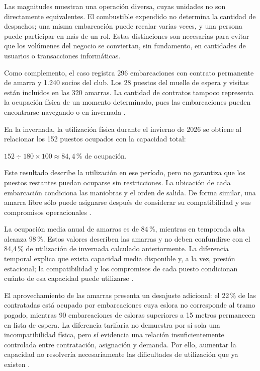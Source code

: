 Las magnitudes muestran una operación diversa, cuyas unidades no son directamente equivalentes. El combustible expendido no determina la cantidad de despachos; una misma embarcación puede recalar varias veces, y una persona puede participar en más de un rol. Estas distinciones son necesarias para evitar que los volúmenes del negocio se conviertan, sin fundamento, en cantidades de usuarios o transacciones informáticas.

Como complemento, el caso registra 296 embarcaciones con contrato permanente de amarra y 1.240 socios del club. Los 28 puestos del muelle de espera y visitas están incluidos en las 320 amarras. La cantidad de contratos tampoco representa la ocupación física de un momento determinado, pues las embarcaciones pueden encontrarse navegando o en invernada \parencite[cap.~2, seccs.~2.2-2.3, p.~6]{pucv-caso07-2026}.

En la invernada, la utilización física durante el invierno de 2026 se obtiene al relacionar los 152 puestos ocupados con la capacidad total:

\begin{center}
$152 \div 180 \times 100 \approx 84{,}4$\,\% de ocupación.
\end{center}

Este resultado describe la utilización en ese período, pero no garantiza que los puestos restantes puedan ocuparse sin restricciones. La ubicación de cada embarcación condiciona las maniobras y el orden de salida. De forma similar, una amarra libre sólo puede asignarse después de considerar su compatibilidad y sus compromisos operacionales \parencite[cap.~3, p.~8; cap.~4, seccs.~4.1 y 4.6, pp.~9 y 11]{pucv-caso07-2026}.

La ocupación media anual de amarras es de 84\,\%, mientras en temporada alta alcanza 98\,\%. Estos valores describen las amarras y no deben confundirse con el 84,4\,\% de utilización de invernada calculado anteriormente. La diferencia temporal explica que exista capacidad media disponible y, a la vez, presión estacional; la compatibilidad y los compromisos de cada puesto condicionan cuánto de esa capacidad puede utilizarse \parencite[cap.~7, secc.~7.1, p.~15]{pucv-caso07-2026}.

El aprovechamiento de las amarras presenta un desajuste adicional: el 22\,\% de las contratadas está ocupado por embarcaciones cuya eslora no corresponde al tramo pagado, mientras 90 embarcaciones de esloras superiores a 15 metros permanecen en lista de espera. La diferencia tarifaria no demuestra por sí sola una incompatibilidad física, pero sí evidencia una relación insuficientemente controlada entre contratación, asignación y demanda. Por ello, aumentar la capacidad no resolvería necesariamente las dificultades de utilización que ya existen \parencite[cap.~4, secc.~4.1, p.~9]{pucv-caso07-2026}.

